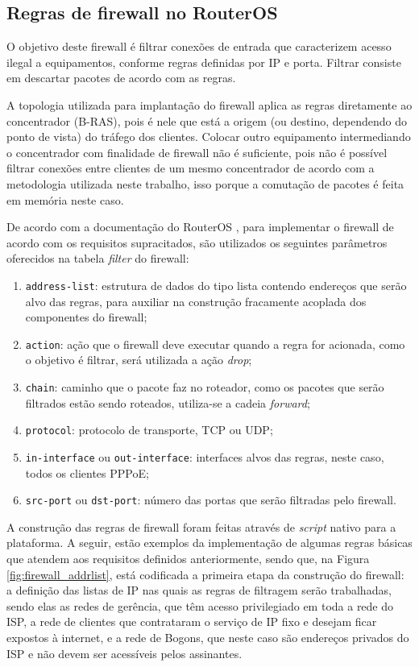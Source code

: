 \subsection{Regras de firewall no RouterOS}

    O objetivo deste firewall é filtrar conexões de entrada que caracterizem acesso ilegal a equipamentos, conforme regras definidas por IP e porta. Filtrar consiste em descartar pacotes de acordo com as regras.
    
    A topologia utilizada para implantação do firewall aplica as regras diretamente ao concentrador (B-RAS), pois é nele que está a origem (ou destino, dependendo do ponto de vista) do tráfego dos clientes. Colocar outro equipamento intermediando o concentrador com finalidade de firewall não é suficiente, pois não é possível filtrar conexões entre clientes de um mesmo concentrador de acordo com a metodologia utilizada neste trabalho, isso porque a comutação de pacotes é feita em memória neste caso.
    
    De acordo com a documentação do RouterOS \cite{fwmikrotik}, para implementar o firewall de acordo com os requisitos supracitados, são utilizados os seguintes parâmetros oferecidos na tabela \textit{filter} do firewall:
    
    \begin{enumerate}[label=\alph*)]
        \item {\tt address-list}: estrutura de dados do tipo lista contendo endereços que serão alvo das regras, para auxiliar na construção fracamente acoplada dos componentes do firewall;
        \item {\tt action}: ação que o firewall deve executar quando a regra for acionada, como o objetivo é filtrar, será utilizada a ação \textit{drop};
        \item {\tt chain}: caminho que o pacote faz no roteador, como os pacotes que serão filtrados estão sendo roteados, utiliza-se a cadeia \textit{forward};
        \item {\tt protocol}: protocolo de transporte, TCP ou UDP;
        \item {\tt in-interface} ou {\tt out-interface}: interfaces alvos das regras, neste caso, todos os clientes PPPoE;
        \item {\tt src-port} ou {\tt dst-port}: número das portas que serão filtradas pelo firewall.
    \end{enumerate}

    A construção das regras de firewall foram feitas através de \textit{script} nativo para a plataforma. A seguir, estão exemplos da implementação de algumas regras básicas que atendem aos requisitos definidos anteriormente, sendo que, na Figura \ref{fig:firewall_addrlist}, está codificada a primeira etapa da construção do firewall: a definição das listas de IP nas quais as regras de filtragem serão trabalhadas, sendo elas as redes de gerência, que têm acesso privilegiado em toda a rede do ISP, a rede de clientes que contrataram o serviço de IP fixo e desejam ficar expostos à internet, e a rede de Bogons, que neste caso são endereços privados do ISP e não devem ser acessíveis pelos assinantes.
    
